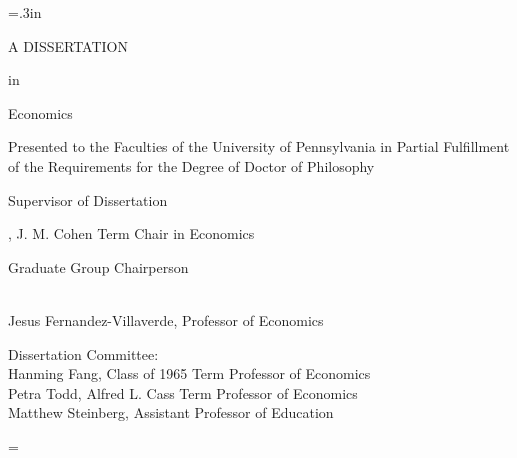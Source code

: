 \large\newlength{\oldparskip}\setlength\oldparskip{\parskip}\parskip=.3in
\thispagestyle{empty}

\begin{center}
    \LARGE \thetitle

    \large \theauthor

    \Large A DISSERTATION

    \large in

    \Large Economics
\end{center}

\noindent\singlespaced\large
Presented to the Faculties of the University of Pennsylvania in Partial
Fulfillment of the Requirements for the Degree of Doctor of Philosophy

\begin{center}
\theyear
\end{center}

\bigskip
\singlespaced
\noindent \begin{minipage}{.45\textwidth}
Supervisor of Dissertation \\
\par\noindent\makebox[2.5in]{\hrulefill}
\theadvisor, J. M. Cohen Term Chair in Economics
\end{minipage}

\bigskip
\noindent Graduate Group Chairperson
\par\noindent\makebox[2.5in]{\hrulefill} \\
\singlespaced
Jesus Fernandez-Villaverde, Professor of Economics\

\noindent
\singlespaced
Dissertation Committee:\\
Hanming Fang, Class of 1965 Term Professor of Economics\\
Petra Todd, Alfred L. Cass Term Professor of Economics\\
Matthew Steinberg, Assistant Professor of Education
\vspace*{\fill}

\normalsize\parskip=\oldparskip
